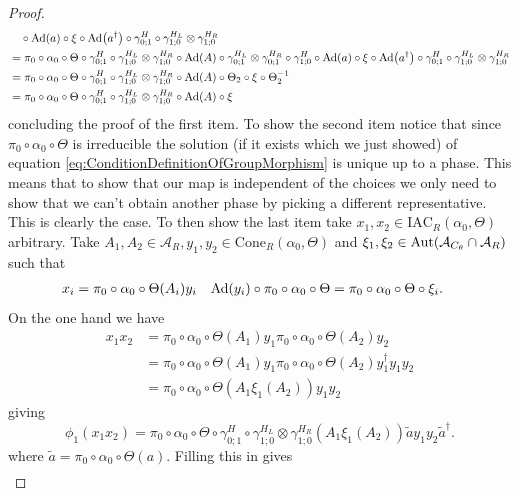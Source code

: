 \documentclass[12pt,a4paper,twoside]{article}
\newcommand{\IAC}{\textrm{IAC}}
\let\originalleft\left
\let\originalright\right
\renewcommand{\left}{\mathopen{}\mathclose\bgroup\originalleft}
\renewcommand{\right}{\aftergroup\egroup\originalright}
\renewcommand{\AA}{\mathcal A}
\newcommand{\Ad}[1]{\textrm{Ad}\left(#1\right)}
\newcommand{\Aut}[1]{\textrm{Aut}\left(#1\right)}
\theoremstyle{definition}
\numberwithin{equation}{section}
\begin{document}
\begin{proof}
\begin{align}
		\nonumber
		&\quad\circ\Ad{a}\circ\xi\circ\Ad{a^\dagger}\circ\gamma^H_{0;1}\circ\gamma^{H_L}_{1;0}\otimes\gamma^{H_R}_{1;0}\\
		&=\pi_0\circ\alpha_0\circ\Theta\circ\gamma^H_{0;1}\circ\gamma^{H_L}_{1;0}\otimes\gamma^{H_R}_{1;0}\circ\Ad{A}\circ\gamma^{H_L}_{0;1}\otimes\gamma^{H_R}_{0;1}\circ\gamma^H_{1;0}\circ\Ad{a}\circ\xi\circ\Ad{a^\dagger}\circ\gamma^H_{0;1}\circ\gamma^{H_L}_{1;0}\otimes\gamma^{H_R}_{1;0}\\
		&=\pi_0\circ\alpha_0\circ\Theta\circ\gamma^H_{0;1}\circ\gamma^{H_L}_{1;0}\otimes\gamma^{H_R}_{1;0}\circ\Ad{A}\circ\Theta_2\circ\xi\circ\Theta_2^{-1}\\
		&=\pi_0\circ\alpha_0\circ\Theta\circ\gamma^H_{0;1}\circ\gamma^{H_L}_{1;0}\otimes\gamma^{H_R}_{1;0}\circ\Ad{A}\circ\xi
	\end{align}
	concluding the proof of the first item. To show the second item notice that since $\pi_0\circ\alpha_0\circ\Theta$ is irreducible the solution (if it exists which we just showed) of equation \eqref{eq:ConditionDefinitionOfGroupMorphism} is unique up to a phase. This means that to show that our map is independent of the choices we only need to show that we can't obtain another phase by picking a different representative. This is clearly the case. To then show the last item take $x_1,x_2\in \IAC_R(\alpha_0,\Theta)$ arbitrary. Take $A_1,A_2\in\AA_R,y_1,y_2\in \textrm{Cone}_R(\alpha_0,\Theta)$ and $\xi_1,\xi_2\in\Aut{\AA_{C_\theta}\cap\AA_R}$ such that
	\begin{align}
		x_i&=\pi_0\circ\alpha_0\circ\Theta(A_i)y_i&\Ad{y_i}\circ\pi_0\circ\alpha_0\circ\Theta&=\pi_0\circ\alpha_0\circ\Theta\circ\xi_i.
	\end{align}
	On the one hand we have
	\begin{align}
		x_1x_2&=\pi_0\circ\alpha_0\circ\Theta(A_1)y_1\pi_0\circ\alpha_0\circ\Theta(A_2)y_2\\
		&=\pi_0\circ\alpha_0\circ\Theta(A_1)y_1\pi_0\circ\alpha_0\circ\Theta(A_2)y_1^{\dagger}y_1y_2\\
		&=\pi_0\circ\alpha_0\circ\Theta(A_1\xi_1(A_2))y_1y_2
	\end{align}
	giving
	\begin{equation}
		\phi_1(x_1x_2)=\pi_0\circ\alpha_0\circ\Theta\circ\gamma^H_{0;1}\circ\gamma^{H_L}_{1;0}\otimes\gamma^{H_R}_{1;0}(A_1\xi_1(A_2))\tilde{a}y_1y_2\tilde{a}^\dagger.
	\end{equation}
	where $\tilde{a}=\pi_0\circ\alpha_0\circ\Theta(a)$. Filling this in gives
	\begin{align}

\end{align}
\end{proof}
\end{document}
